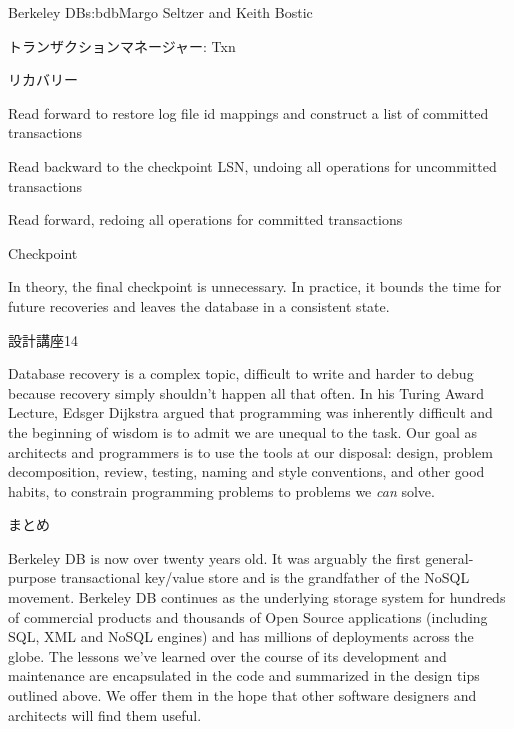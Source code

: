 \begin{aosachapter}{Berkeley DB}{s:bdb}{Margo Seltzer and Keith Bostic}
\begin{aosasect1}{トランザクションマネージャー: Txn}
\begin{aosasect2}{リカバリー}
\begin{aosaenumerate}
  \item Read forward to restore log file id mappings and construct a
  list of committed transactions

  \item Read backward to the checkpoint LSN, undoing all operations for
  uncommitted transactions

  \item Read forward, redoing all operations for committed transactions

  \item Checkpoint

\end{aosaenumerate}

\vspace{-0.2cm}

In theory, the final checkpoint is unnecessary. In practice, it bounds
the time for future recoveries and leaves the database in a consistent
state. 

\begin{aosabox}{設計講座14}

Database recovery is a complex topic, difficult to write and harder to
debug because recovery simply shouldn't happen all that often. In his
Turing Award Lecture, Edsger Dijkstra argued that programming was
inherently difficult and the beginning of wisdom is to admit we are
unequal to the task. Our goal as architects and programmers is to use
the tools at our disposal: design, problem decomposition, review,
testing, naming and style conventions, and other good habits, to
constrain programming problems to problems we \emph{can} solve.

\end{aosabox}

\end{aosasect2}

\end{aosasect1}
\newpage
\begin{aosasect1}{まとめ}

Berkeley DB is now over twenty years old. It was arguably the first
general-purpose transactional key/value store and is the grandfather
of the NoSQL movement. Berkeley DB continues as the underlying storage
system for hundreds of commercial products and thousands of Open
Source applications (including SQL, XML and NoSQL engines) and has
millions of deployments across the globe. The lessons we've learned
over the course of its development and maintenance are encapsulated in
the code and summarized in the design tips outlined above. We offer
them in the hope that other software designers and architects will
find them useful.

\end{aosasect1}

\end{aosachapter}
